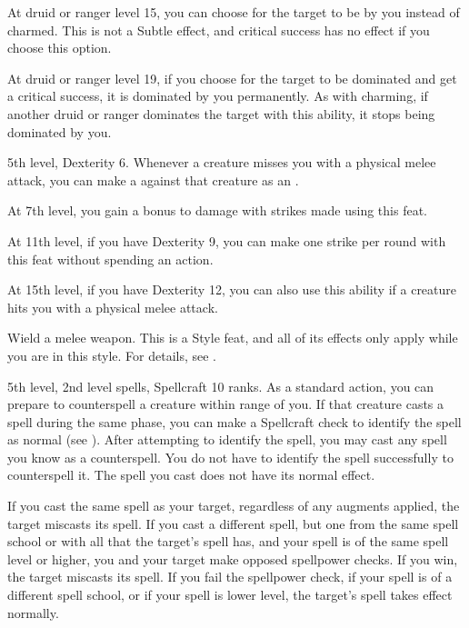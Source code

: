     At druid or ranger level 15, you can choose for the target to be \dominated by you instead of charmed.
    This is not a Subtle effect, and critical success has no effect if you choose this option.

    At druid or ranger level 19, if you choose for the target to be dominated and get a critical success, it is dominated by you permanently.
    As with charming, if another druid or ranger dominates the target with this ability, it stops being dominated by you.

    \featpres 5th level, Dexterity 6.
    \featben Whenever a creature misses you with a physical melee attack, you can make a  against that creature as an .

    At 7th level, you gain a  bonus to damage with strikes made using this feat.

    At 11th level, if you have Dexterity 9, you can make one strike per round with this feat without spending an action.

    At 15th level, if you have Dexterity 12, you can also use this ability if a creature hits you with a physical melee attack.

    \stylereq Wield a melee weapon.
     This is a Style feat, and all of its effects only apply while you are in this style.
    For details, see .

    \featpres 5th level, 2nd level spells, Spellcraft 10 ranks.
    \featben As a standard action, you can prepare to counterspell a creature within \rngmed range of you.
    If that creature casts a spell during the same phase, you can make a Spellcraft check to identify the spell as normal (see ).
    After attempting to identify the spell, you may cast any spell you know as a counterspell.
    You do not have to identify the spell successfully to counterspell it.
    The spell you cast does not have its normal effect.

    If you cast the same spell as your target, regardless of any augments applied, the target miscasts its spell.
    If you cast a different spell, but one from the same spell school or with all  that the target's spell has, and your spell is of the same spell level or higher, you and your target make opposed spellpower checks.
    If you win, the target miscasts its spell.
    If you fail the spellpower check, if your spell is of a different spell school, or if your spell is lower level, the target's spell takes effect normally.

